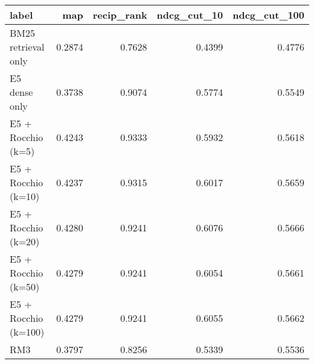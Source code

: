 \begin{tabular}{lrrrr}
\toprule
label & map & recip_rank & ndcg_cut_10 & ndcg_cut_100 \\
\midrule
BM25 retrieval only & 0.2874 & 0.7628 & 0.4399 & 0.4776 \\
E5 dense only & 0.3738 & 0.9074 & 0.5774 & 0.5549 \\
E5 + Rocchio (k=5) & 0.4243 & 0.9333 & 0.5932 & 0.5618 \\
E5 + Rocchio (k=10) & 0.4237 & 0.9315 & 0.6017 & 0.5659 \\
E5 + Rocchio (k=20) & 0.4280 & 0.9241 & 0.6076 & 0.5666 \\
E5 + Rocchio (k=50) & 0.4279 & 0.9241 & 0.6054 & 0.5661 \\
E5 + Rocchio (k=100) & 0.4279 & 0.9241 & 0.6055 & 0.5662 \\
RM3 & 0.3797 & 0.8256 & 0.5339 & 0.5536 \\
\bottomrule
\end{tabular}
